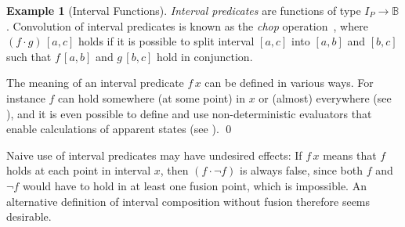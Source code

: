 \documentclass[12pt]{article}
\theoremstyle{definition}
\newtheorem{example}{Example}
\begin{document}
\begin{example}[Interval Functions]
\emph{Interval predicates} are functions of type $I_P\to
\mathbb{B}$. Convolution of interval predicates is known as the
\emph{chop} operation~\cite{Mos00}, where $(f \cdot g)\, [a, c]$ holds if
it is possible to split interval $[a, c]$ into $[a, b]$ and $[b, c]$
such that $f\, [a, b]$ and $g\, [b, c]$ hold in conjunction.
\begin{center}
\end{center}

The meaning of an interval predicate $f\, x$ can be defined in
various ways. For instance $f$ can hold somewhere (at some point) in
$x$ or (almost) everywhere (see \cite{Mos00,ZH04}), and it is even
possible to define and use non-deterministic evaluators \cite{HBDJ13}
that enable calculations of apparent states (see \cite{DHD14}). \qed
\end{example}

Naive use of interval predicates may have undesired effects: If $f\,
x$ means that $f$ holds at each point in interval $x$, then
$(f\cdot\neg f)$ is always false, since both $f$ and $\neg f$ would
have to hold in at least one fusion point, which is impossible. An
alternative definition of interval composition without fusion
therefore seems desirable.
\end{document}
